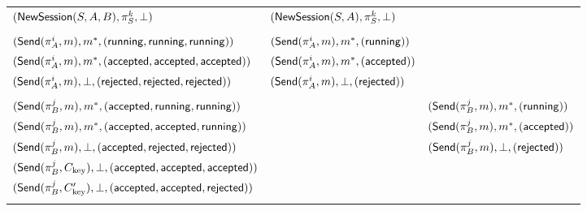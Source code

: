 \begin{landscape}
\begin{table}
\begin{threeparttable}
\begin{tabular}{  l  l  l }
		\rowcolor{ProtocolOneColor}
		$(\Q{NewSession}(S,A, B),\oracle[S][k], \bot)$  & $(\Q{NewSession}(S,  A  ),\oracle[S][k], \bot )$ & \NULL \\
		
		
		\rowcolor{EmptyRowColor}
		
		&& \\
		
		\rowcolor{ProtocolOneColor}
		$(\Q{Send}(\oracle[A][i],m), m^*, (\running,\running,\running))$ &$(\Q{Send}(\oracle[A][i],m), m^*, (\running))$& \NULL  \\
		\rowcolor{ProtocolOneColor}
		$(\Q{Send}(\oracle[A][i],m), m^*, (\accepted,\accepted,\accepted))$ &$(\Q{Send}(\oracle[A][i],m), m^*, (\accepted))$& \NULL \\
		\rowcolor{ProtocolOneColor}
		$(\Q{Send}(\oracle[A][i],m), \bot, (\rejected,\rejected,\rejected))$ &$(\Q{Send}(\oracle[A][i],m), \bot, (\rejected))$& \NULL \\
		
		
		\rowcolor{EmptyRowColor}
		&&\\
		
		\rowcolor{ProtocolTwoColor}
		$(\Q{Send}(\oracle[B][j],m), m^*, (\accepted,\running,\running))$ & \NULL &$(\Q{Send}(\oracle[B][j],m), m^*, (\running))$  \\
		\rowcolor{ProtocolTwoColor}
		$(\Q{Send}(\oracle[B][j],m), m^*, (\accepted,\accepted,\running))$ & \NULL & $(\Q{Send}(\oracle[B][j],m), m^*, (\accepted))$ \\
		\rowcolor{ProtocolTwoColor}		
		$(\Q{Send}(\oracle[B][j],m), \bot, (\accepted,\rejected,\rejected))$ & \NULL & $(\Q{Send}(\oracle[B][j],m), \bot, (\rejected))$ \\
		\rowcolor{ProtocolTwoColor}
		$(\Q{Send}(\oracle[B][j],\Ckey), \bot, (\accepted,\accepted,\accepted))$ &  \NULL & \NULL  \\
		\rowcolor{ProtocolTwoColor}
		$(\Q{Send}(\oracle[B][j],\Ckey'), \bot, (\accepted,\accepted,\rejected))$ & \NULL & \NULL  \\
		
		
		\rowcolor{EmptyRowColor}
		&& \\
		
		

\end{tabular}
\end{threeparttable}
\end{table}
\end{landscape}
